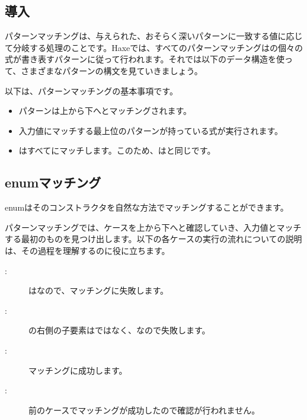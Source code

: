 \subsection{導入}
\label{lf-pattern-matching-introduction}

パターンマッチングは、与えられた、おそらく深いパターンに一致する値に応じて分岐する処理のことです。Haxeでは、すべてのパターンマッチングはの個々の式が書き表すパターンに従って行われます。それでは以下のデータ構造を使って、さまざまなパターンの構文を見ていきましょう。


以下は、パターンマッチングの基本事項です。

\begin{itemize}
	\item パターンは上から下へとマッチングされます。
	\item 入力値にマッチする最上位のパターンが持っている式が実行されます。
	\item \expr{_}はすべてにマッチします。このため、はと同じです。
\end{itemize}

\subsection{enumマッチング}
\label{lf-pattern-matching-enums}

enumはそのコンストラクタを自然な方法でマッチングすることができます。


パターンマッチングでは、ケースを上から下へと確認していき、入力値とマッチする最初のものを見つけ出します。以下の各ケースの実行の流れについての説明は、その過程を理解するのに役に立ちます。

\begin{description}
	\item[:] はなので、マッチングに失敗します。
	\item[:] の右側の子要素はではなく、なので失敗します。
	\item[:] マッチングに成功します。
	\item[:] 前のケースでマッチングが成功したので確認が行われません。
\end{description}

